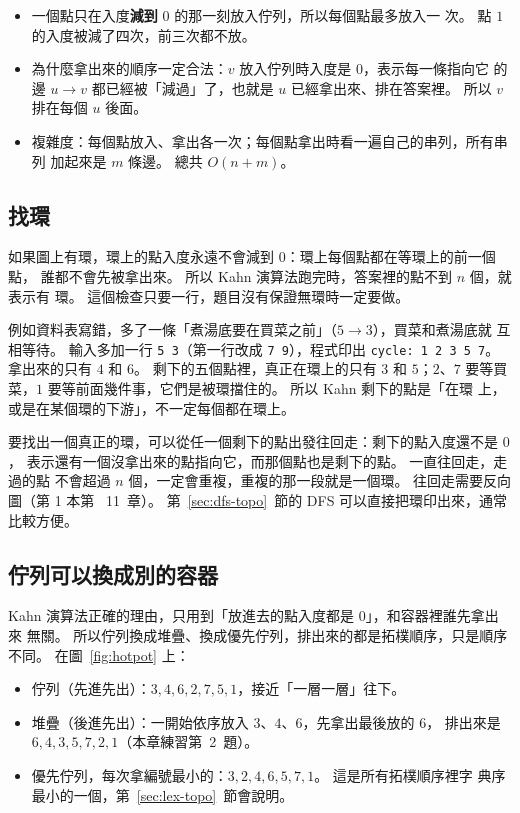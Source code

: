 \begin{itemize}
\item 一個點只在入度\textbf{減到} $0$ 的那一刻放入佇列，所以每個點最多放入一
次。 點 $1$ 的入度被減了四次，前三次都不放。
\item 為什麼拿出來的順序一定合法：$v$ 放入佇列時入度是 $0$，表示每一條指向它
的邊 $u \to v$ 都已經被「減過」了，也就是 $u$ 已經拿出來、排在答案裡。 所以
$v$ 排在每個 $u$ 後面。
\item 複雜度：每個點放入、拿出各一次；每個點拿出時看一遍自己的串列，所有串列
加起來是 $m$ 條邊。 總共 $O(n + m)$。
\end{itemize}

\subsection{找環}
\label{sec:kahn-cycle}

如果圖上有環，環上的點入度永遠不會減到 $0$：環上每個點都在等環上的前一個點，
誰都不會先被拿出來。 所以 Kahn 演算法跑完時，答案裡的點不到 $n$ 個，就表示有
環。 這個檢查只要一行，題目沒有保證無環時一定要做。

例如資料表寫錯，多了一條「煮湯底要在買菜之前」（$5 \to 3$），買菜和煮湯底就
互相等待。 輸入多加一行 \texttt{5 3}（第一行改成 \texttt{7 9}），程式印出
\texttt{cycle: 1 2 3 5 7}。 拿出來的只有 $4$ 和 $6$。 剩下的五個點裡，真正在環上的只有 $3$ 和 $5$；$2$、$7$
要等買菜，$1$ 要等前面幾件事，它們是被環擋住的。 所以 Kahn 剩下的點是「在環
上，或是在某個環的下游」，不一定每個都在環上。

要找出一個真正的環，可以從任一個剩下的點出發往回走：剩下的點入度還不是 $0$，
表示還有一個沒拿出來的點指向它，而那個點也是剩下的點。 一直往回走，走過的點
不會超過 $n$ 個，一定會重複，重複的那一段就是一個環。 往回走需要反向圖（第 1 本第
~11~章）。 第~\ref{sec:dfs-topo}~節的 DFS 可以直接把環印出來，通常比較方便。

\subsection{佇列可以換成別的容器}

Kahn 演算法正確的理由，只用到「放進去的點入度都是 $0$」，和容器裡誰先拿出來
無關。 所以佇列換成堆疊、換成優先佇列，排出來的都是拓樸順序，只是順序不同。
在圖~\ref{fig:hotpot} 上：

\begin{itemize}
\item 佇列（先進先出）：$3, 4, 6, 2, 7, 5, 1$，接近「一層一層」往下。
\item 堆疊（後進先出）：一開始依序放入 $3$、$4$、$6$，先拿出最後放的 $6$，
排出來是 $6, 4, 3, 5, 7, 2, 1$（本章練習第~2~題）。
\item 優先佇列，每次拿編號最小的：$3, 2, 4, 6, 5, 7, 1$。 這是所有拓樸順序裡字
典序最小的一個，第~\ref{sec:lex-topo}~節會說明。
\end{itemize}

